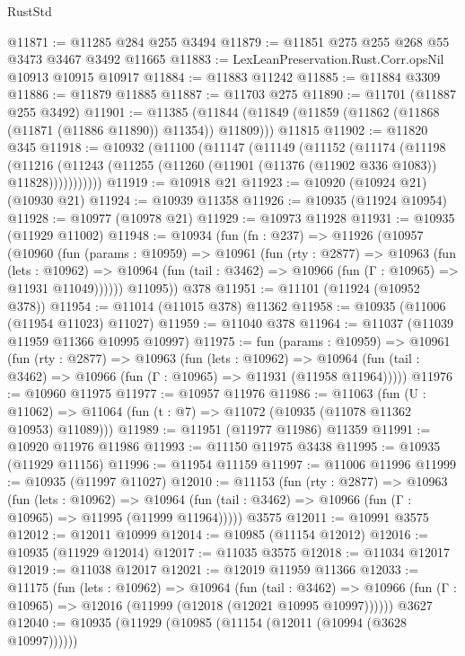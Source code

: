 \begin{lexlean}{RustStd}
\begin{coremodule}
{{{{{{{{{{{{{{{{{{{@11871 := @11285 @284 @255 @3494
@11879 := @11851 @275 @255 @268 @55 @3473 @3467 @3492 @11665
@11883 := LexLeanPreservation.Rust.Corr.opsNil @10913 @10915 @10917
@11884 := @11883 @11242
@11885 := @11884 @3309
@11886 := @11879 @11885
@11887 := @11703 @275
@11890 := @11701 (@11887 @255 @3492)
@11901 := @11385
    (@11844 (@11849 (@11859 (@11862 (@11868 (@11871 (@11886 @11890)) @11354)) @11809)))
    @11815
@11902 := @11820 @345
@11918 := @10932
    (@11100
      (@11147
        (@11149
          (@11152
            (@11174
              (@11198
                (@11216
                  (@11243 (@11255 (@11260 (@11901 (@11376 (@11902 @336 @1083)) @11828)))))))))))
@11919 := @10918 @21
@11923 := @10920 (@10924 @21) (@10930 @21)
@11924 := @10939 @11358
@11926 := @10935 (@11924 @10954)
@11928 := @10977 (@10978 @21)
@11929 := @10973 @11928
@11931 := @10935 (@11929 @11002)
@11948 := @10934
    (fun (fn : @237) =>
    @11926
      (@10957
        (@10960
          (fun (params : @10959) =>
          @10961
            (fun (rty : @2877) =>
            @10963
              (fun (lets : @10962) =>
              @10964 (fun (tail : @3462) => @10966 (fun (Γ : @10965) => @11931 @11049))))))
        @11095))
    @378
@11951 := @11101 (@11924 (@10952 @378))
@11954 := @11014 (@11015 @378) @11362
@11958 := @10935 (@11006 (@11954 @11023) @11027)
@11959 := @11040 @378
@11964 := @11037 (@11039 @11959 @11366 @10995 @10997)
@11975 := fun (params : @10959) =>
  @10961
    (fun (rty : @2877) =>
    @10963
      (fun (lets : @10962) =>
      @10964 (fun (tail : @3462) => @10966 (fun (Γ : @10965) => @11931 (@11958 @11964)))))
@11976 := @10960 @11975
@11977 := @10957 @11976
@11986 := @11063
    (fun (U : @11062) => @11064 (fun (t : @7) => @11072 (@10935 (@11078 @11362 @10953) @11089)))
@11989 := @11951 (@11977 @11986) @11359
@11991 := @10920 @11976 @11986
@11993 := @11150 @11975 @3438
@11995 := @10935 (@11929 @11156)
@11996 := @11954 @11159
@11997 := @11006 @11996
@11999 := @10935 (@11997 @11027)
@12010 := @11153
    (fun (rty : @2877) =>
    @10963
      (fun (lets : @10962) =>
      @10964 (fun (tail : @3462) => @10966 (fun (Γ : @10965) => @11995 (@11999 @11964)))))
    @3575
@12011 := @10991 @3575
@12012 := @12011 @10999
@12014 := @10985 (@11154 @12012)
@12016 := @10935 (@11929 @12014)
@12017 := @11035 @3575
@12018 := @11034 @12017
@12019 := @11038 @12017
@12021 := @12019 @11959 @11366
@12033 := @11175
    (fun (lets : @10962) =>
    @10964
      (fun (tail : @3462) =>
      @10966 (fun (Γ : @10965) => @12016 (@11999 (@12018 (@12021 @10995 @10997))))))
    @3627
@12040 := @10935 (@11929 (@10985 (@11154 (@12011 (@10994 (@3628 @10997))))))
}}}}}}}}}}}}}}}}}}}
\end{coremodule}
\end{lexlean}

